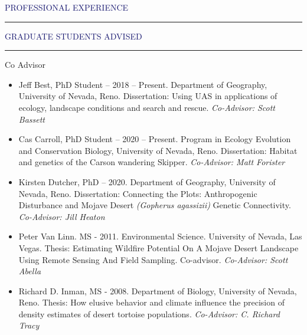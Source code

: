 \documentclass{resume} %
\renewenvironment{rSection}[1]{
\sectionskip
\textcolor{MidnightBlue}{\MakeUppercase{#1}}
\sectionlineskip
\hrule
\begin{list}{}{
\setlength{\leftmargin}{1.5em}
}
\item[]
}{
\end{list}
}
\begin{document}
\begin{rSection}{Professional Experience}
\begin{rSection}{Graduate Students Advised}
\begin{rSubsection}{Co Advisor}{}{}{}
\begin{itemize}
\item Jeff Best, PhD Student – 2018 – Present. Department of Geography, University of Nevada, Reno.  Dissertation: Using UAS in applications of ecology, landscape conditions and search and rescue. \textit{Co-Advisor: Scott Bassett}
\item Cas Carroll, PhD Student – 2020 – Present. Program in Ecology Evolution and Conservation Biology, University of Nevada, Reno.  Dissertation: Habitat and genetics of the Carson wandering Skipper. \textit{Co-Advisor: Matt Forister}
\item Kirsten Dutcher, PhD – 2020. Department of Geography, University of Nevada, Reno. Dissertation: Connecting the Plots: Anthropogenic Disturbance and 
Mojave Desert \textit{(Gopherus agassizii)} Genetic Connectivity. \textit{Co-Advisor: Jill Heaton}
\item Peter Van Linn. MS - 2011. Environmental Science. University of Nevada, Las Vegas. Thesis: Estimating Wildfire Potential On A Mojave Desert Landscape Using Remote Sensing And Field Sampling. Co-advisor. \textit{Co-Advisor: Scott Abella}
\item Richard D. Inman, MS - 2008. Department of Biology, University of Nevada, Reno. Thesis: How elusive behavior and climate influence the precision of density estimates of desert tortoise populations. \textit{Co-Advisor: C. Richard Tracy}
\end{itemize}


\end{rSubsection}
\end{rSection}
\end{rSection}
\end{document}

